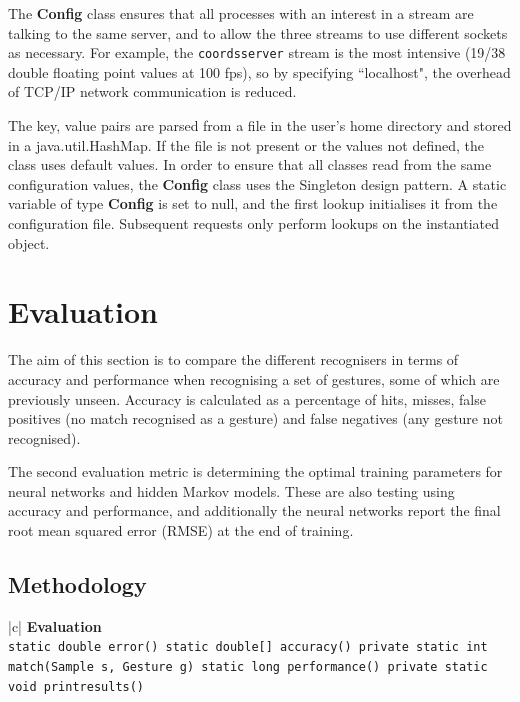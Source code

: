 \documentclass[12pt,a4,notitlepage]{report}
\renewcommand{\_}{\texttt{\symbol{95}}}
\newcommand{\<}{\texttt{\symbol{60}}}
\renewcommand{\>}{\texttt{\symbol{62}}}
\newcommand{\class}[1]{\textbf{#1}}
\newcommand{\scopendpoint}[1]{\texttt{#1}}
\newcommand{\variable}[1]{\texttt{#1}}
\begin{document}
The \class{Config} class ensures that all processes with an interest in a stream are talking to the same server, and to allow the three streams to use different sockets as necessary. For example, the \scopendpoint{coordsserver} stream is the most intensive (19/38 double floating point values at 100 fps), so by specifying ``localhost", the overhead of TCP/IP network communication is reduced.

The \<key, value\> pairs are parsed from a file in the user's home directory and stored in a java.util.HashMap. If the file is not present or the values not defined, the class uses default values. In order to ensure that all classes read from the same configuration values, the \class{Config} class uses the Singleton design pattern. A static variable of type \class{Config} is set to null, and the first lookup initialises it from the configuration file. Subsequent requests only perform lookups on the instantiated object.

\chapter{Evaluation}

The aim of this section is to compare the different recognisers in terms of accuracy and performance when recognising a set of gestures, some of which are previously unseen. Accuracy is calculated as a percentage of hits, misses, false positives (no match recognised as a gesture) and false negatives (any gesture not recognised).

The second evaluation metric is determining the optimal training parameters for neural networks and hidden Markov models. These are also testing using accuracy and performance, and additionally the neural networks report the final root mean squared error (RMSE) at the end of training.

\section{Methodology}

\begin{tabular}{|c|} \hline 
\class{Evaluation} \\ \hline
{}
{\variable{static double error() \newline
static double[] accuracy() \newline
private static int match(Sample s, Gesture g) \newline
static long performance() \newline
private static void print\_results()
} } \\ \hline
\end{tabular}
\end{document}
